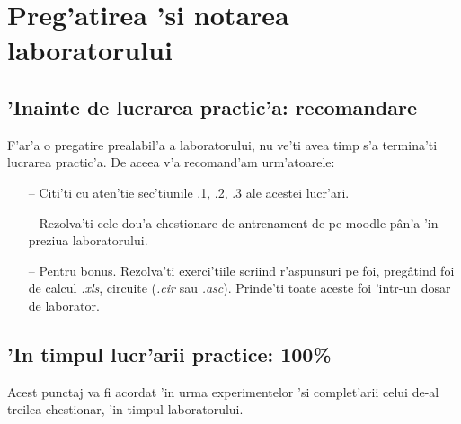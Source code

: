 \section{Preg'atirea 'si notarea laboratorului}


\subsection*{'Inainte de lucrarea practic'a: recomandare}

F'ar'a o pregatire prealabil'a a laboratorului, nu ve'ti avea timp s'a termina'ti lucrarea practic'a. De aceea v'a recomand'am urm'atoarele:

\begin{itemize}
\item[--] Citi'ti cu aten'tie sec'tiunile \thechapter.1, \thechapter.2, \thechapter.3 ale acestei lucr'ari.
\item[--] Rezolva'ti cele dou'a chestionare de antrenament de pe moodle p\^an'a 'in preziua laboratorului.
\item[--] Pentru bonus. Rezolva'ti exerci'tiile scriind r'aspunsuri pe foi, preg\^atind foi de calcul \textit{.xls}, circuite (\textit{.cir} sau \textit{.asc}). Prinde'ti toate aceste foi 'intr-un dosar de laborator.
\end{itemize}

%
%

\subsection*{'In timpul lucr'arii practice: 100\%}
Acest punctaj va fi acordat 'in urma experimentelor 'si complet'arii celui de-al treilea chestionar, 'in timpul laboratorului.

